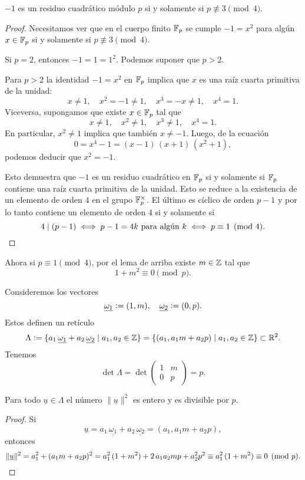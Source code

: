 \documentclass{article}
\numberwithin{equation}{section}
\begin{document}
\begin{lema}
  $-1$ es un residuo cuadrático módulo $p$ si y solamente si
  $p \not\equiv 3\pmod{4}$.

  \begin{proof}
    Necesitamos ver que en el cuerpo finito $\mathbb{F}_p$ se cumple $-1 = x^2$ para
    algún $x\in \mathbb{F}_p$ si y solamente si $p \not\equiv 3\pmod{4}$.

    Si $p = 2$, entonces $-1 = 1 = 1^2$. Podemos suponer que $p > 2$.

    Para $p > 2$ la identidad $-1 = x^2$ en $\mathbb{F}_p$ implica que $x$ es una raíz
    cuarta primitiva de la unidad:
    $$x \ne 1, \quad x^2 = -1 \ne 1, \quad x^3 = -x \ne 1, \quad x^4 = 1.$$
    Viceversa, supongamos que existe $x\in \mathbb{F}_p$ tal que
    $$x \ne 1, \quad x^2 \ne 1, \quad x^3 \ne 1, \quad x^4 = 1.$$
    En particular, $x^2 \ne 1$ implica que también $x \ne -1$. Luego, de la
    ecuación
    $$0 = x^4 - 1 = (x - 1)\,(x + 1)\,(x^2 + 1),$$
    podemos deducir que $x^2 = -1$.

    Esto demuestra que $-1$ es un residuo cuadrático en $\mathbb{F}_p$ si y solamente
    si $\mathbb{F}_p$ contiene una raíz cuarta primitiva de la unidad. Esto se reduce a
    la existencia de un elemento de orden $4$ en el grupo $\mathbb{F}_p^\times$. El
    último es cíclico de orden $p-1$ y por lo tanto contiene un elemento de
    orden $4$ si y solamente si
    \[ 4 \mid (p-1) \iff p-1 = 4k
       \text{ para algún }k \iff p\equiv 1\pmod{4}. \qedhere \]
  \end{proof}
\end{lema}

Ahora si $p \equiv 1 \pmod{4}$, por el lema de arriba existe $m\in\mathbb{Z}$ tal que
$$1 + m^2 \equiv 0 \pmod{p}.$$

Consideremos los vectores
$$\underline{\omega_1} \mathrel{\mathop:}= (1,m), \quad \underline{\omega_2} \mathrel{\mathop:}= (0,p).$$
Estos definen un retículo
$$\Lambda \mathrel{\mathop:}= \{ a_1\,\underline{\omega_1} + a_2\,\underline{\omega_2} \mid a_1, a_2 \in \mathbb{Z} \} = \{ (a_1, a_1 m + a_2 p) \mid a_1, a_2 \in \mathbb{Z} \} \subset \mathbb{R}^2.$$
Tenemos
$$\det \Lambda = \det \begin{pmatrix}
1 & m \\
0 & p
\end{pmatrix} = p.$$

\begin{observacion}
  Para todo $\underline{u} \in \Lambda$ el número $\|\underline{u}\|^2$ es
  entero y es divisible por $p$.

  \begin{proof}
    Si
    $$\underline{u} = a_1\,\underline{\omega_1} + a_2\,\underline{\omega_2} = (a_1, a_1 m + a_2 p),$$
    entonces
    \[ \|\underline{u}\|^2 = a_1^2 + (a_1 m + a_2 p)^2 = a_1^2 \, (1 + m^2) +
      2\,a_1 a_2 m p + a_2^2 p ^2 \equiv a_1^2 \, (1 + m^2)
      \equiv 0 \pmod{p}. \qedhere \]
  \end{proof}
\end{observacion}
\end{document}
